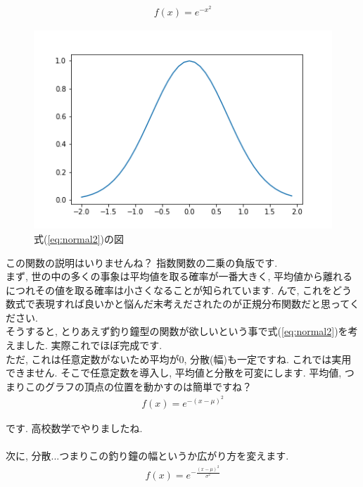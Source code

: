 \documentclass[11pt,a4paper]{jsarticle}                    %
\begin{document}
\begin{eqnarray}
\label{eq:normal2}
f(x) = e^{-x^2}
\end{eqnarray}

\begin{figure}[H]
\label{im:normal}
  \centering
  \includegraphics[width=120mm,bb=0 0 432 288]{../figures/normal2.png}
  \caption{式(\ref{eq:normal2})の図}
\end{figure}

この関数の説明はいりませんね？ 指数関数の二乗の負版です.\\
まず, 世の中の多くの事象は平均値を取る確率が一番大きく, 平均値から離れるにつれその値を取る確率は小さくなることが知られています. んで, これをどう数式で表現すれば良いかと悩んだ末考えだされたのが正規分布関数だと思ってください.\\
そうすると, とりあえず釣り鐘型の関数が欲しいという事で式(\ref{eq:normal2})を考えました. 実際これでほぼ完成です.\\
ただ, これは任意定数がないため平均が0, 分散(幅)も一定ですね. これでは実用できません. そこで任意定数を導入し, 平均値と分散を可変にします. 平均値, つまりこのグラフの頂点の位置を動かすのは簡単ですね？\\

\begin{eqnarray}
\label{eq:normal3}
f(x) = e^{-(x-\mu)^2}
\end{eqnarray}

です. 高校数学でやりましたね.\\
\\
次に, 分散...つまりこの釣り鐘の幅というか広がり方を変えます. \\

\begin{eqnarray}
\label{eq:normal4}
f(x) = e^{-\frac{(x-\mu)^2}{\sigma^2}}
\end{eqnarray}
\end{document}
